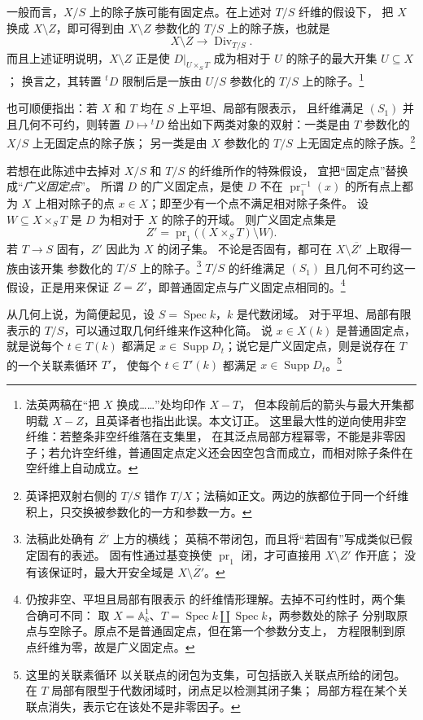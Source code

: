 \documentclass[openany,fontset=fandol]{ctexbook}
\DeclareMathOperator{\Div}{Div}
\DeclareMathOperator{\pr}{pr}
\DeclareMathOperator{\Supp}{Supp}
\DeclareMathOperator{\Spec}{Spec}
\begin{document}
一般而言，\(X/S\) 上的除子族可能有固定点。在上述对 \(T/S\) 纤维的假设下，
把 \(X\) 换成 \(X\setminus Z\)，即可得到由 \(X\setminus Z\) 参数化的
\(T/S\) 上的除子族，也就是
\[
 X\setminus Z\longrightarrow\Div_{T/S}.
\]
而且上述证明说明，\(X\setminus Z\) 正是使 \(D|_{U\times_S T}\)
成为相对于 \(U\) 的除子的最大开集 \(U\subseteq X\)；
换言之，其转置 \({}^{t}D\) 限制后是一族由 \(U/S\) 参数化的 \(T/S\) 上的除子。\footnote{法英两稿在“把 \(X\) 换成……”处均印作 \(X-T\)，
但本段前后的箭头与最大开集都明载 \(X-Z\)，且英译者也指出此误。本文订正。
这里最大性的逆向使用非空纤维：若整条非空纤维落在支集里，
在其泛点局部方程幂零，不能是非零因子；若允许空纤维，普通固定点定义还会因空包含而成立，而相对除子条件在空纤维上自动成立。}

\medskip
也可顺便指出：若 \(X\) 和 \(T\) 均在 \(S\) 上平坦、局部有限表示，
且纤维满足 \((S_1)\) 并且几何不可约，则转置 \(D\mapsto{}^{t}D\)
给出如下两类对象的双射：一类是由 \(T\) 参数化的 \(X/S\) 上无固定点的除子族；
另一类是由 \(X\) 参数化的 \(T/S\) 上无固定点的除子族。\footnote{英译把双射右侧的
\(T/S\) 错作 \(T/X\)；法稿如正文。两边的族都位于同一个纤维积上，只交换被参数化的一方和参数一方。}

若想在此陈述中去掉对 \(X/S\) 和 \(T/S\) 的纤维所作的特殊假设，
宜把“固定点”替换成“\emph{广义固定点}”。
所谓 \(D\) 的广义固定点，是使 \(D\) 不在 \(\pr_1^{-1}(x)\)
的所有点上都为 \(X\) 上相对除子的点 \(x\in X\)；即至少有一个点不满足相对除子条件。
设 \(W\subseteq X\times_S T\) 是 \(D\) 为相对于 \(X\) 的除子的开域。
则广义固定点集是
\[
 Z'=\pr_1\bigl((X\times_S T)\setminus W\bigr).
\]
若 \(T\to S\) 固有，\(Z'\) 因此为 \(X\) 的闭子集。
不论是否固有，都可在 \(X\setminus\overline{Z'}\) 上取得一族由该开集
参数化的 \(T/S\) 上的除子。\footnote{法稿此处确有 \(\overline{Z'}\) 上方的横线；
英稿不带闭包，而且将“若固有”写成类似已假定固有的表述。
固有性通过基变换使 \(\pr_1\) 闭，才可直接用 \(X\setminus Z'\) 作开底；
没有该保证时，最大开安全域是 \(X\setminus\overline{Z'}\)。}
\(T/S\) 的纤维满足 \((S_1)\) 且几何不可约这一假设，正是用来保证
\(Z=Z'\)，即普通固定点与广义固定点相同的。\footnote{仍按非空、平坦且局部有限表示
的纤维情形理解。去掉不可约性时，两个集合确可不同：
取 \(X=\mathbb A^1_k\)、\(T=\Spec k\amalg\Spec k\)，两参数处的除子
分别取原点与空除子。原点不是普通固定点，但在第一个参数分支上，
方程限制到原点纤维为零，故是广义固定点。}

\clearpage
从几何上说，为简便起见，设 \(S=\Spec k\)，\(k\) 是代数闭域。
对于平坦、局部有限表示的 \(T/S\)，可以通过取几何纤维来作这种化简。
说 \(x\in X(k)\) 是普通固定点，就是说每个 \(t\in T(k)\) 都满足
\(x\in\Supp D_t\)；说它是广义固定点，则是说存在 \(T\) 的一个关联素循环 \(T'\)，
使每个 \(t\in T'(k)\) 都满足 \(x\in\Supp D_t\)。\footnote{这里的关联素循环
以关联点的闭包为支集，可包括嵌入关联点所给的闭包。
在 \(T\) 局部有限型于代数闭域时，闭点足以检测其闭子集；
局部方程在某个关联点消失，表示它在该处不是非零因子。}
\end{document}
